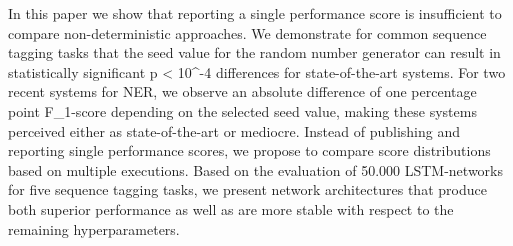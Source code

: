 In this paper we show that reporting a single performance score is insufficient to compare non-deterministic approaches. We demonstrate for common sequence tagging tasks that the seed value for the random number generator can result in statistically significant p < 10^-4 differences for state-of-the-art systems. For two recent systems for NER, we observe an absolute difference of one percentage point F\_1-score depending on the selected seed value, making these systems perceived either as state-of-the-art or mediocre. Instead of publishing and reporting single performance scores, we propose to compare score distributions based on multiple executions. Based on the evaluation of 50.000 LSTM-networks for five sequence tagging tasks, we present network architectures that produce both superior performance as well as are more stable with respect to the remaining hyperparameters.
